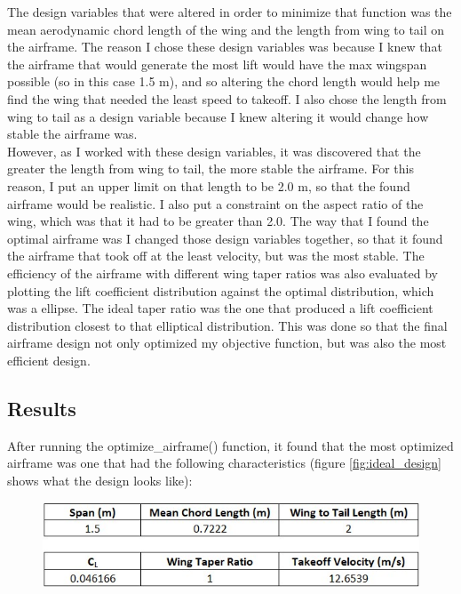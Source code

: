 \documentclass{journal}
\begin{document}
	The design variables that were altered in order to minimize that function was the mean aerodynamic chord length of the wing and the length from wing to tail on the airframe. The reason I chose these design variables was because I knew that the airframe that would generate the most lift would have the max wingspan possible (so in this case 1.5 m), and so altering the chord length would help me find the wing that needed the least speed to takeoff. I also chose the length from wing to tail as a design variable because I knew altering it would change how stable the airframe was.\\
	
	However, as I worked with these design variables, it was discovered that the greater the length from wing to tail, the more stable the airframe. For this reason, I put an upper limit on that length to be 2.0 m, so that the found airframe would be realistic. I also put a constraint on the aspect ratio of the wing, which was that it had to be greater than 2.0. The way that I found the optimal airframe was I changed those design variables together, so that it found the airframe that took off at the least velocity, but was the most stable. The efficiency of the airframe with different wing taper ratios was also evaluated by plotting the lift coefficient distribution against the optimal distribution, which was a ellipse. The ideal taper ratio was the one that produced a lift coefficient distribution closest to that elliptical distribution. This was done so that the final airframe design not only optimized my objective function, but was also the most efficient design.\\
	
	\subsection{Results}
	
	After running the optimize\_airframe() function, it found that the most optimized airframe was one that had the following characteristics (figure \ref{fig:ideal_design} shows what the design looks like):
	
	\begin{figure}[H]
		\includegraphics{../graphics/ideal_attributes.jpg}
		\label{fig:ideal_attr}
	\end{figure}
	
\end{document}

